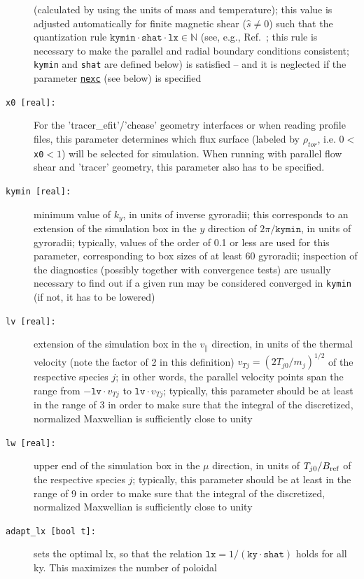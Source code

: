 \documentclass[12pt]{article}
\begin{document}
\begin{description}
(calculated by using the units of mass and temperature); this value is adjusted automatically for
finite magnetic shear ($\hat s\ne 0$) such that the quantization rule
$\texttt{kymin}\cdot\texttt{shat}\cdot\texttt{lx}\in\mathbb{N}$ (see, e.g., Ref.~\cite{beer}; this rule is
necessary to make the parallel and radial boundary conditions consistent; \texttt{kymin} and \texttt{shat}
are defined below) is satisfied -- and it is neglected if the parameter \hyperlink{nexc}{\texttt{nexc}} (see below) is specified
\item[\texttt{x0 [real]:}] For the 'tracer\_efit'/'chease' geometry interfaces or when reading profile files, 
this parameter determines which 
flux surface (labeled by $\rho_{tor}$, i.e. $0<$\texttt{x0}$<1$) will be selected for simulation. When 
running with parallel flow shear and 'tracer' geometry, this parameter also has to be specified.
\item[\texttt{kymin [real]:}] minimum value of $k_y$, in units of inverse gyroradii; this corresponds to
an extension of the simulation box in the $y$ direction of $2\pi/\texttt{kymin}$, in units of gyroradii;
typically, values of the order of 0.1 or less are used for this parameter, corresponding to box sizes of
at least 60 gyroradii; inspection of the \gene diagnostics (possibly together with convergence tests) are
usually necessary to find out if a given run may be considered converged in \texttt{kymin} (if not, it
has to be lowered)
\item[\texttt{lv [real]:}] extension of the simulation box in the $v_\|$ direction, in units of the
thermal velocity (note the factor of 2 in this definition) $v_{Tj}=(2T_{j0}/m_j)^{1/2}$ of the respective
species $j$; in other words, the parallel velocity points span the range from $- \mathtt{lv} \cdot v_{Tj}$
to $\mathtt{lv} \cdot v_{Tj}$; typically,
this parameter should be at least in the range of 3 in order to make sure that the integral of the discretized,
normalized Maxwellian is sufficiently close to unity
\item[\texttt{lw [real]:}] upper end of the simulation box in the $\mu$ direction, in units of
$T_{j0}/B_{\rm ref}$ of the respective species $j$; typically, this parameter should be at least
in the range of 9 in order to make sure that the integral of the discretized, normalized Maxwellian is
sufficiently close to unity
\item[\texttt{adapt\_lx [bool t]:}] sets the optimal lx, so that the relation
  $\texttt{lx}=1/(\texttt{ky}\cdot\texttt{shat})$ holds for all ky. This maximizes the number of poloidal 

\end{description}
\end{document}
